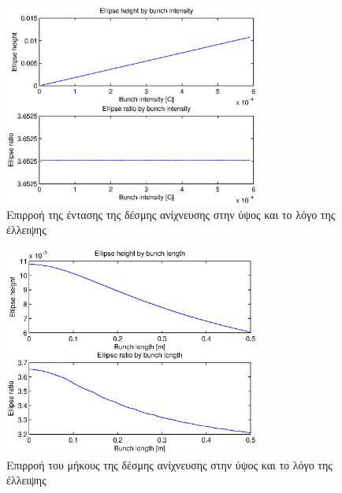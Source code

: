 \begin{figure}[tbh]
\includegraphics[width=0.75\textwidth]{figures/beam_deflection_script_03_elipse_height}
\centering
\caption{Επιρροή της έντασης της δέσμης ανίχνευσης στην ύψος και το λόγο της έλλειψης}
\label{fig:beam_deflection_script_03_elipse_height}
\end{figure}

\begin{figure}[tbh]
\includegraphics[width=0.75\textwidth]{figures/beam_deflection_script_04_elipse_height_by_bunch_intensity}
\centering
\caption{Επιρροή του μήκους της δέσμης ανίχνευσης στην ύψος και το λόγο της έλλειψης}
\label{fig:beam_deflection_script_04_elipse_height_by_bunch_intensity}
\end{figure}

